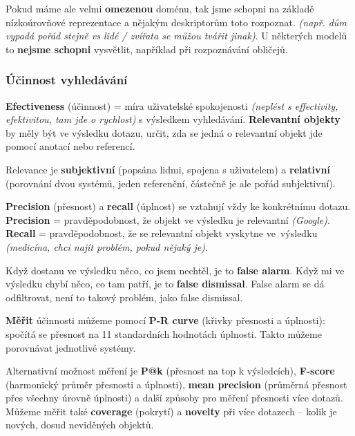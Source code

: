 Pokud máme ale velmi \textbf{omezenou} doménu, tak jsme schopni na základě nízkoúrovňové reprezentace a nějakým deskriptorům toto rozpoznat. \textit{(např. dům vypadá pořád stejně vs lidé / zvířata se můžou tvářit jinak)}. U některých modelů to \textbf{nejsme schopni} vysvětlit, například při rozpoznávání obličejů.

\subsubsection{Účinnost vyhledávání}

\textbf{Efectiveness} (účinnost) = míra uživatelské spokojenosti \textit{(neplést s effectivity, efektivitou, tam jde o rychlost)} s výsledkem vyhledávání. \textbf{Relevantní objekty} by měly být ve výsledku dotazu, určit, zda se jedná o relevantní objekt jde pomocí anotací nebo referencí.

Relevance je \textbf{subjektivní} (popsána lidmi, spojena s uživatelem) a \textbf{relativní} (porovnání dvou systémů, jeden referenční, částečně je ale pořád subjektivní).

\textbf{Precision} (přesnost) a \textbf{recall} (úplnost) se vztahují vždy ke konkrétnímu dotazu. \textbf{Precision} = pravděpodobnost, že objekt ve výsledku je relevantní \textit{(Google)}. \textbf{Recall} = pravděpodobnost, že se relevantní objekt vyskytne ve~výsled\-ku \textit{(medicína, chci najít problém, pokud nějaký je)}.

Když dostanu ve výsledku něco, co jsem nechtěl, je to \textbf{false alarm}. Když mi ve výsledku chybí něco, co tam patří, je to \textbf{false dismissal}. False alarm se dá odfiltrovat, není to takový problém, jako false dismissal.

\textbf{Měřit} účinnosti můžeme pomocí \textbf{P-R curve} (křivky přesnosti a úplnosti): spočítá se přesnost na 11 standardních hodnotách úplnosti. Takto můžeme porovnávat jednotlivé systémy.

Alternativní možnost měření je \textbf{P@k} (přesnost na top k výsledcích), \textbf{F-score} (harmonický průměr přesnosti a úplnosti), \textbf{mean precision} (průměrná přesnost přes všechny úrovně úplnosti) a další způsoby pro měření přesnosti více dotazů. Můžeme měřit také \textbf{coverage} (pokrytí) a \textbf{novelty} při více dotazech -- kolik je nových, dosud neviděných objektů.
